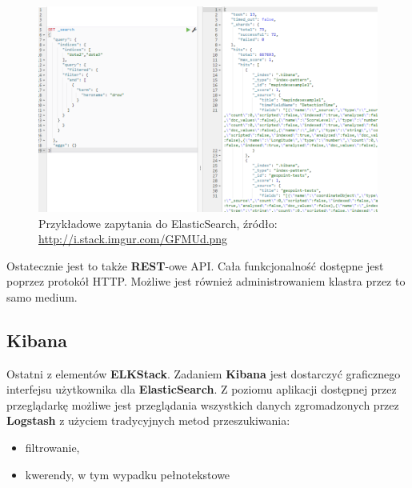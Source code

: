     \begin{figure}[H]
        \centering
        \includegraphics[width=1.0\textwidth]{images/es_query}
        \caption[Przykładowe zapytania do ElasticSearch]{
            Przykładowe zapytania do ElasticSearch, źródło: \url{http://i.stack.imgur.com/GFMUd.png}
        }
        \label{chapter:application:elkstack:es:query}
    \end{figure}

    Ostatecznie jest to także \textbf{REST}-owe API. Cała funkcjonalność dostępne jest poprzez
    protokół HTTP. Możliwe jest również administrowaniem klastra przez to samo medium.
    
\subsection{Kibana}
\label{chapter:application:elkstack:kibana}

    Ostatni z elementów \textbf{ELKStack}. Zadaniem \textbf{Kibana} jest dostarczyć graficznego interfejsu
    użytkownika dla \textbf{ElasticSearch}. Z poziomu aplikacji dostępnej przez przeglądarkę możliwe
    jest przeglądania wszystkich danych zgromadzonych przez \textbf{Logstash} z użyciem tradycyjnych
    metod przeszukiwania:
    \begin{itemize}
        \item filtrowanie,
        \item kwerendy, w tym wypadku pełnotekstowe
    \end{itemize}
    
